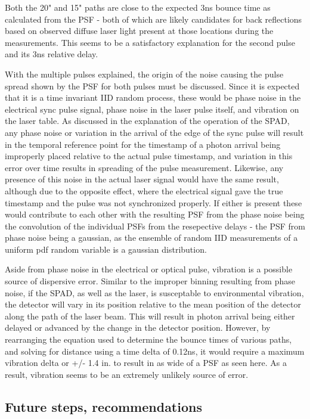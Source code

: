 \documentclass[a4paper]{article}
\begin{document}
Both the 20" and 15" paths are close to the expected 3ns bounce time as calculated from the PSF - both of which are likely candidates for back reflections based on observed diffuse laser light present at those locations during the measurements. This seems to be a satisfactory explanation for the second pulse and its 3ns relative delay.

With the multiple pulses explained, the origin of the noise causing the pulse spread shown by the PSF for both pulses must be discussed. Since it is expected that it is a time invariant IID random process, these would be phase noise in the electrical sync pulse signal, phase noise in the laser pulse itself, and vibration on the laser table. As discussed in the explanation of the operation of the SPAD, any phase noise or variation in the arrival of the edge of the sync pulse will result in the temporal reference point for the timestamp of a photon arrival being improperly placed relative to the actual pulse timestamp, and variation in this error over time results in spreading of the pulse measurement.
Likewise, any presence of this noise in the actual laser signal would have the same result, although due to the opposite effect, where the electrical signal gave the true timestamp and the pulse was not synchronized properly.
If either is present these would contribute to each other with the resulting PSF from the phase noise being the convolution of the individual PSFs from the resepective delays - the PSF from phase noise being a gaussian, as the ensemble of random IID measurements of a uniform pdf random variable is a gaussian distribution.

Aside from phase noise in the electrical or optical pulse, vibration is a possible source of dispersive error. Similar to the improper binning resulting from phase noise, if the SPAD, as well as the laser, is susceptable to environmental vibration, the detector will vary in its position relative to the mean position of the detector along the path of the laser beam. This will result in photon arrival being either delayed or advanced by the change in the detector position. However, by rearranging the equation used to determine the bounce times of various paths, and solving for distance using a time delta of 0.12ns, it would require a maximum vibration delta or +/- 1.4 in. to result in as wide of a PSF as seen here. As a result, vibration seems to be an extremely unlikely source of error.

\subsection{Future steps, recommendations}
\end{document}

